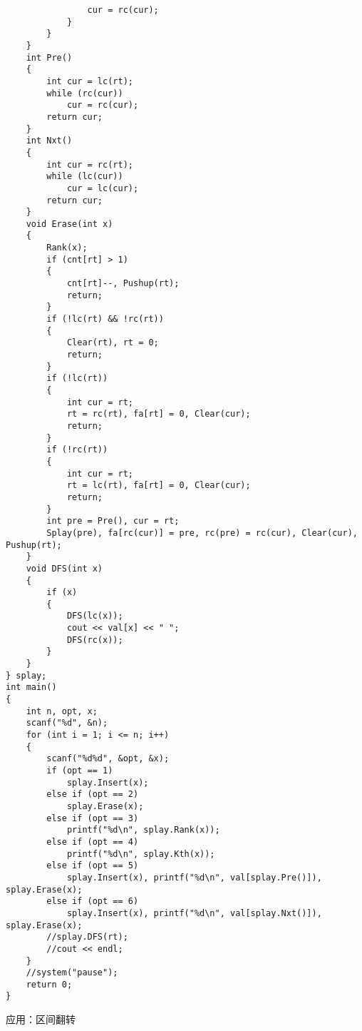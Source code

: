 \begin{lstlisting}
                cur = rc(cur);
            }
        }
    }
    int Pre()
    {
        int cur = lc(rt);
        while (rc(cur))
            cur = rc(cur);
        return cur;
    }
    int Nxt()
    {
        int cur = rc(rt);
        while (lc(cur))
            cur = lc(cur);
        return cur;
    }
    void Erase(int x)
    {
        Rank(x);
        if (cnt[rt] > 1)
        {
            cnt[rt]--, Pushup(rt);
            return;
        }
        if (!lc(rt) && !rc(rt))
        {
            Clear(rt), rt = 0;
            return;
        }
        if (!lc(rt))
        {
            int cur = rt;
            rt = rc(rt), fa[rt] = 0, Clear(cur);
            return;
        }
        if (!rc(rt))
        {
            int cur = rt;
            rt = lc(rt), fa[rt] = 0, Clear(cur);
            return;
        }
        int pre = Pre(), cur = rt;
        Splay(pre), fa[rc(cur)] = pre, rc(pre) = rc(cur), Clear(cur), Pushup(rt);
    }
    void DFS(int x)
    {
        if (x)
        {
            DFS(lc(x));
            cout << val[x] << " ";
            DFS(rc(x));
        }
    }
} splay;
int main()
{
    int n, opt, x;
    scanf("%d", &n);
    for (int i = 1; i <= n; i++)
    {
        scanf("%d%d", &opt, &x);
        if (opt == 1)
            splay.Insert(x);
        else if (opt == 2)
            splay.Erase(x);
        else if (opt == 3)
            printf("%d\n", splay.Rank(x));
        else if (opt == 4)
            printf("%d\n", splay.Kth(x));
        else if (opt == 5)
            splay.Insert(x), printf("%d\n", val[splay.Pre()]), splay.Erase(x);
        else if (opt == 6)
            splay.Insert(x), printf("%d\n", val[splay.Nxt()]), splay.Erase(x);
        //splay.DFS(rt);
        //cout << endl;
    }
    //system("pause");
    return 0;
}
\end{lstlisting}
应用：区间翻转
